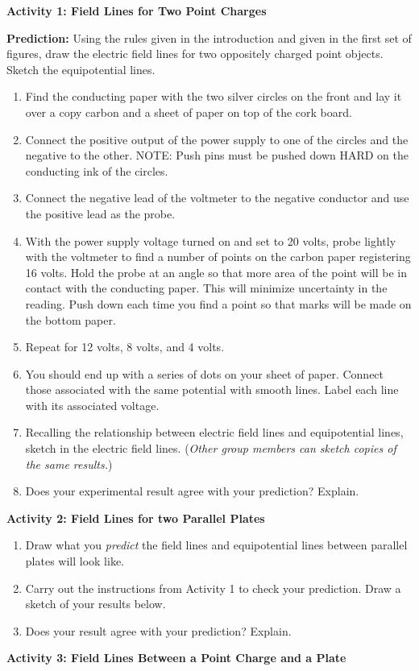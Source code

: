 \textbf{Activity 1: Field Lines for Two Point Charges}

\textbf{Prediction:} Using the rules given in the introduction and
given in the first set of figures, draw the electric field lines for two
oppositely charged point objects. Sketch the equipotential lines.
\answerspace{1in}

\begin{enumerate}
\item Find the conducting paper with the two silver circles on the front
and lay it over a copy carbon and a sheet of paper on top of the cork
board.
\item Connect the positive output of the power supply to one of the circles
and the negative to the other. NOTE: Push pins must be pushed down HARD on the 
conducting ink of the circles.
\item Connect the negative lead of the voltmeter to the negative conductor
and use the positive lead as the probe. 
\item With the power supply voltage turned on and set to 20 volts, probe
lightly with the voltmeter to find a number of points on the carbon
paper registering 16 volts. Hold the probe at an angle so that more area of the 
point will be in contact with the conducting paper. This will minimize 
uncertainty in the reading. Push down each time you find a point so
that marks will be made on the bottom paper.
\item Repeat for 12 volts, 8 volts, and 4 volts.
\item You should end up with a series of dots on your sheet of paper. Connect
those associated with the same potential with smooth lines. Label each line 
with its associated voltage.
\item Recalling the relationship between electric field lines and equipotential
lines, sketch in the electric field lines. (\emph{Other group members
can sketch copies of the same results.})
\item Does your experimental result agree with your prediction? Explain.
\answerspace{15mm}

\end{enumerate}

\pagebreak[2]
\textbf{Activity 2: Field Lines for two Parallel Plates}

\begin{enumerate}
\item Draw what you \textit{predict} the field lines and equipotential
lines between parallel plates will look like.
\answerspace{1.2in}

\item Carry out the instructions from Activity 1 to check your prediction.  Draw a sketch of your results below.
\answerspace{1.2in}

\item Does your result agree with your prediction? Explain.
\answerspace{.5in}

\end{enumerate}
\textbf{Activity 3: Field Lines Between a Point Charge and a Plate}

